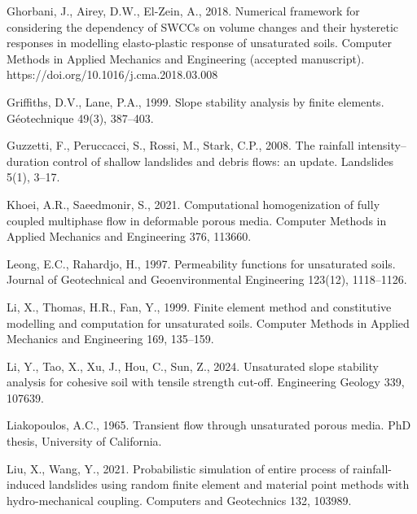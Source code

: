 Ghorbani, J., Airey, D.W., El-Zein, A., 2018. Numerical framework for considering the dependency of SWCCs on volume
changes and their hysteretic responses in modelling elasto-plastic response of unsaturated soils. Computer Methods
in Applied Mechanics and Engineering (accepted manuscript). https://doi.org/10.1016/j.cma.2018.03.008

Griffiths, D.V., Lane, P.A., 1999. Slope stability analysis by finite elements. G\'eotechnique 49(3), 387--403.

Guzzetti, F., Peruccacci, S., Rossi, M., Stark, C.P., 2008. The rainfall intensity--duration control of shallow
landslides and debris flows: an update. Landslides 5(1), 3--17.

Khoei, A.R., Saeedmonir, S., 2021. Computational homogenization of fully coupled multiphase flow in deformable
porous media. Computer Methods in Applied Mechanics and Engineering 376, 113660.

Leong, E.C., Rahardjo, H., 1997. Permeability functions for unsaturated soils. Journal of Geotechnical and
Geoenvironmental Engineering 123(12), 1118--1126.

Li, X., Thomas, H.R., Fan, Y., 1999. Finite element method and constitutive modelling and computation for
unsaturated soils. Computer Methods in Applied Mechanics and Engineering 169, 135--159.

Li, Y., Tao, X., Xu, J., Hou, C., Sun, Z., 2024. Unsaturated slope stability analysis for cohesive soil with tensile
strength cut-off. Engineering Geology 339, 107639.

Liakopoulos, A.C., 1965. Transient flow through unsaturated porous media. PhD thesis, University of California.

Liu, X., Wang, Y., 2021. Probabilistic simulation of entire process of rainfall-induced landslides using random
finite element and material point methods with hydro-mechanical coupling. Computers and Geotechnics 132, 103989.

